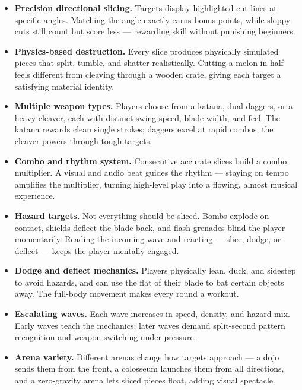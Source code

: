 \documentclass[12pt]{article}
\begin{document}
\begin{itemize}[leftmargin=2em]
    \item \textbf{Precision directional slicing.} Targets display highlighted cut lines at specific angles. Matching the angle exactly earns bonus points, while sloppy cuts still count but score less --- rewarding skill without punishing beginners.

    \item \textbf{Physics-based destruction.} Every slice produces physically simulated pieces that split, tumble, and shatter realistically. Cutting a melon in half feels different from cleaving through a wooden crate, giving each target a satisfying material identity.

    \item \textbf{Multiple weapon types.} Players choose from a katana, dual daggers, or a heavy cleaver, each with distinct swing speed, blade width, and feel. The katana rewards clean single strokes; daggers excel at rapid combos; the cleaver powers through tough targets.

    \item \textbf{Combo and rhythm system.} Consecutive accurate slices build a combo multiplier. A visual and audio beat guides the rhythm --- staying on tempo amplifies the multiplier, turning high-level play into a flowing, almost musical experience.

    \item \textbf{Hazard targets.} Not everything should be sliced. Bombs explode on contact, shields deflect the blade back, and flash grenades blind the player momentarily. Reading the incoming wave and reacting --- slice, dodge, or deflect --- keeps the player mentally engaged.

    \item \textbf{Dodge and deflect mechanics.} Players physically lean, duck, and sidestep to avoid hazards, and can use the flat of their blade to bat certain objects away. The full-body movement makes every round a workout.

    \item \textbf{Escalating waves.} Each wave increases in speed, density, and hazard mix. Early waves teach the mechanics; later waves demand split-second pattern recognition and weapon switching under pressure.

    \item \textbf{Arena variety.} Different arenas change how targets approach --- a dojo sends them from the front, a colosseum launches them from all directions, and a zero-gravity arena lets sliced pieces float, adding visual spectacle.
\end{itemize}
\end{document}
